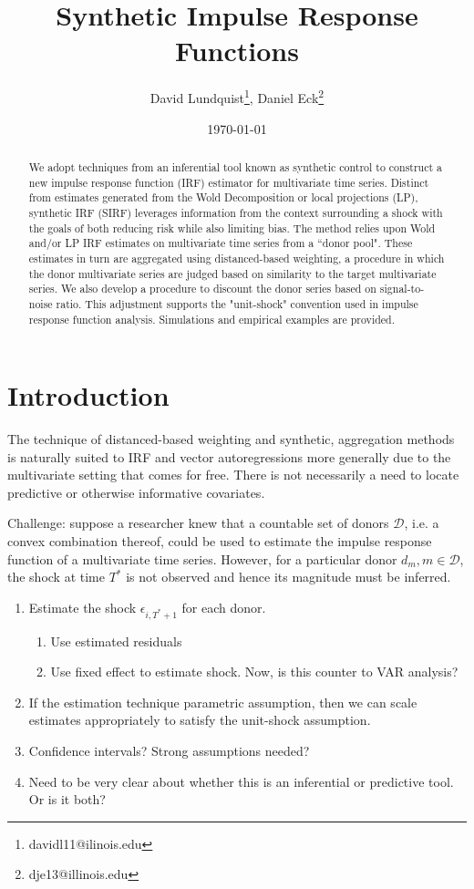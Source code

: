\documentclass[11pt]{article}
\title{Synthetic Impulse Response Functions}
\author{David Lundquist\thanks{davidl11@ilinois.edu}, Daniel Eck\thanks{dje13@illinois.edu} }
\affil{Department of Statistics, University of Illinois at Urbana-Champaign}
\date{\today}
\theoremstyle{definition}
\begin{document}
\maketitle

\begin{abstract}
We adopt techniques from an inferential tool known as synthetic control to construct a new impulse response function (IRF) estimator for multivariate time series.  Distinct from estimates generated from the Wold Decomposition or local projections (LP), synthetic IRF (SIRF) leverages information from the context surrounding a shock with the goals of both reducing risk while also limiting bias.  The method relies upon Wold and/or LP IRF estimates on multivariate time series from a ``donor pool".  These estimates in turn are aggregated using distanced-based weighting, a procedure in which the donor multivariate series are judged based on similarity to the target multivariate series.  We also develop a procedure to discount the donor series based on signal-to-noise ratio.  This adjustment supports the "unit-shock" convention used in impulse response function analysis.  Simulations and empirical examples are provided.

\end{abstract}

\section{Introduction}

The technique of distanced-based weighting and synthetic, aggregation methods is naturally suited to IRF and vector autoregressions more generally due to the multivariate setting that comes for free.  There is not necessarily a need to locate predictive or otherwise informative covariates.  

Challenge: suppose a researcher knew that a countable set of donors $\mathcal{D}$, i.e. a convex combination thereof, could be used to estimate the impulse response function of a multivariate time series.  However, for a particular donor $d_{m}, m\in \mathcal{D}$, the shock at time $T^*$ is not observed and hence its magnitude must be inferred.

\begin{enumerate}
    \item Estimate the shock $\epsilon_{i,T^*+1}$ for each donor.
    \begin{enumerate}
      \item Use estimated residuals
      \item Use fixed effect to estimate shock.  Now, is this counter to VAR analysis?
    \end{enumerate}
    \item If the estimation technique parametric assumption, then we can scale estimates appropriately to satisfy the unit-shock assumption.
    \item Confidence intervals?  Strong assumptions needed?
    \item Need to be very clear about whether this is an inferential or predictive tool.  Or is it both?
\end{enumerate}
\end{document}
